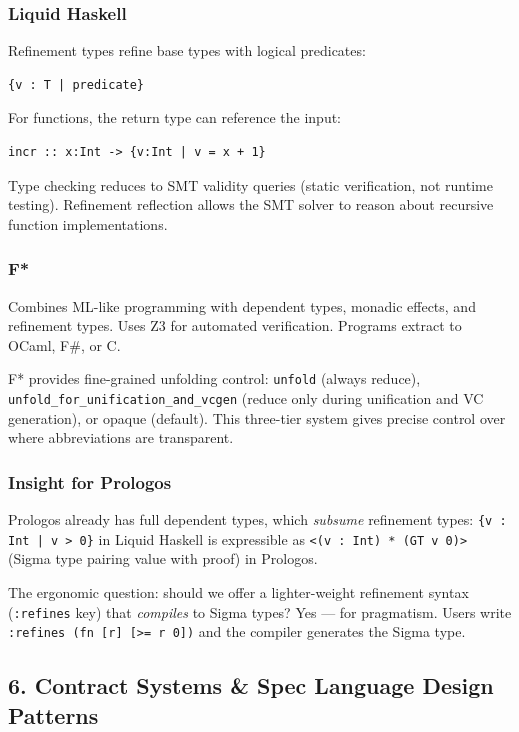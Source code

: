 \documentclass[11pt]{article}
\begin{document}
\subsubsection{Liquid Haskell}
\label{sec:org38eba1d}

Refinement types refine base types with logical predicates:

\begin{verbatim}
{v : T | predicate}
\end{verbatim}

For functions, the return type can reference the input:

\begin{verbatim}
incr :: x:Int -> {v:Int | v = x + 1}
\end{verbatim}

Type checking reduces to SMT validity queries (static verification, not runtime
testing). Refinement reflection allows the SMT solver to reason about recursive
function implementations.
\subsubsection{F*}
\label{sec:org39f13fd}

Combines ML-like programming with dependent types, monadic effects, and
refinement types. Uses Z3 for automated verification. Programs extract to
OCaml, F\#, or C.

F* provides fine-grained unfolding control: \texttt{unfold} (always reduce),
\texttt{unfold\_for\_unification\_and\_vcgen} (reduce only during unification and VC
generation), or opaque (default). This three-tier system gives precise control
over where abbreviations are transparent.
\subsubsection{Insight for Prologos}
\label{sec:orgeb03883}

Prologos already has full dependent types, which \emph{subsume} refinement types:
\texttt{\{v : Int | v > 0\}} in Liquid Haskell is expressible as
\texttt{<(v : Int) * (GT v 0)>} (Sigma type pairing value with proof) in Prologos.

The ergonomic question: should we offer a lighter-weight refinement syntax
(\texttt{:refines} key) that \emph{compiles} to Sigma types? Yes --- for pragmatism. Users
write \texttt{:refines (fn [r] [>= r 0])} and the compiler generates the Sigma type.
\subsection{6. Contract Systems \& Spec Language Design Patterns}
\label{sec:org5fdfeba}
\end{document}

